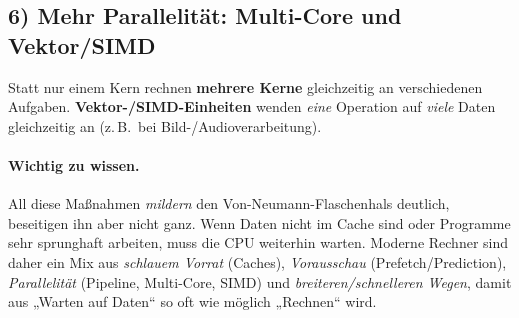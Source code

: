 \documentclass[../skript/main.tex]{subfiles}
\begin{document}
\subsection*{6) Mehr Parallelität: Multi-Core und Vektor/SIMD}
Statt nur einem Kern rechnen \textbf{mehrere Kerne} gleichzeitig an verschiedenen Aufgaben.
\textbf{Vektor-/SIMD-Einheiten} wenden \emph{eine} Operation auf \emph{viele} Daten gleichzeitig an
(z.\,B.\ bei Bild-/Audioverarbeitung).

\paragraph{Wichtig zu wissen.}
All diese Maßnahmen \emph{mildern} den Von-Neumann-Flaschenhals deutlich, beseitigen ihn aber nicht ganz.
Wenn Daten nicht im Cache sind oder Programme sehr sprunghaft arbeiten, muss die CPU weiterhin warten.
Moderne Rechner sind daher ein Mix aus \emph{schlauem Vorrat} (Caches), \emph{Vorausschau}
(Prefetch/Prediction), \emph{Parallelität} (Pipeline, Multi-Core, SIMD) und \emph{breiteren/schnelleren Wegen},
damit aus „Warten auf Daten“ so oft wie möglich „Rechnen“ wird.


	
\end{document}
